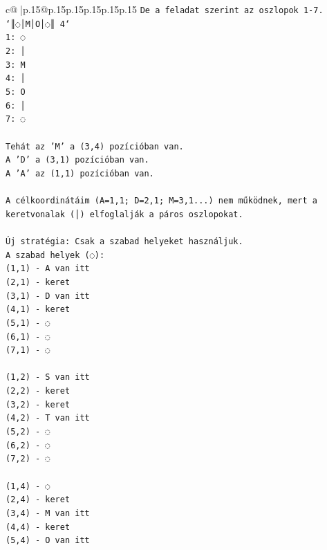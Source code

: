 \documentclass{article}
\begin{document}
{\begin{supertabular}{c@{$\;$}|p{.15\linewidth}@{}p{.15\linewidth}p{.15\linewidth}p{.15\linewidth}p{.15\linewidth}p{.15\linewidth}}
{{{\texttt{De a feladat szerint az oszlopok 1{-}7.} \\
\texttt{`║◌│M│O│◌║ 4`} \\
\texttt{1: ◌} \\
\texttt{2: │} \\
\texttt{3: M} \\
\texttt{4: │} \\
\texttt{5: O} \\
\texttt{6: │} \\
\texttt{7: ◌} \\
\\ 
\texttt{Tehát az 'M' a (3,4) pozícióban van.} \\
\texttt{A 'D' a (3,1) pozícióban van.} \\
\texttt{A 'A' az (1,1) pozícióban van.} \\
\\ 
\texttt{A célkoordinátáim (A=1,1; D=2,1; M=3,1...) nem működnek, mert a keretvonalak (│) elfoglalják a páros oszlopokat.} \\
\\ 
\texttt{Új stratégia: Csak a szabad helyeket használjuk.} \\
\texttt{A szabad helyek (◌):} \\
\texttt{(1,1) {-} A van itt} \\
\texttt{(2,1) {-} keret} \\
\texttt{(3,1) {-} D van itt} \\
\texttt{(4,1) {-} keret} \\
\texttt{(5,1) {-} ◌} \\
\texttt{(6,1) {-} ◌} \\
\texttt{(7,1) {-} ◌} \\
\\ 
\texttt{(1,2) {-} S van itt} \\
\texttt{(2,2) {-} keret} \\
\texttt{(3,2) {-} keret} \\
\texttt{(4,2) {-} T van itt} \\
\texttt{(5,2) {-} ◌} \\
\texttt{(6,2) {-} ◌} \\
\texttt{(7,2) {-} ◌} \\
\\ 
\texttt{(1,4) {-} ◌} \\
\texttt{(2,4) {-} keret} \\
\texttt{(3,4) {-} M van itt} \\
\texttt{(4,4) {-} keret} \\
\texttt{(5,4) {-} O van itt} \\
}}}
\end{supertabular}}
\end{document}
